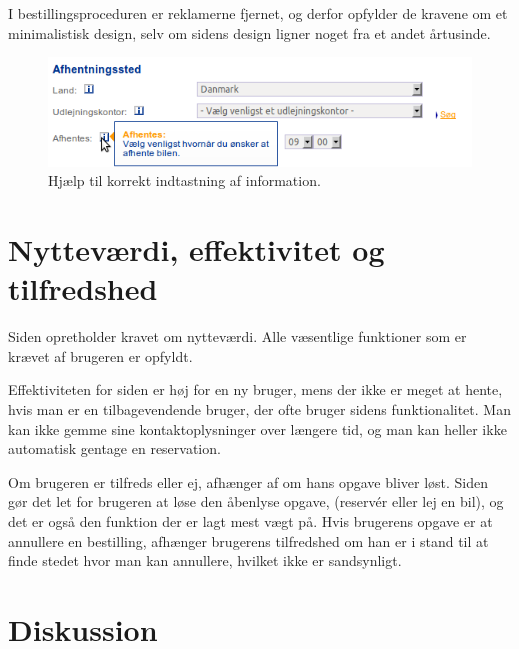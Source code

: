 \documentclass[a4paper]{article}
\begin{document}
I bestillingsproceduren er reklamerne fjernet, og derfor opfylder de kravene om
et minimalistisk design, selv om sidens design ligner noget fra et andet
årtusinde.

\begin{figure}[htbp]
  \begin{center}
    \includegraphics[scale=.6]{7.png}
  \end{center}
  \caption{Hjælp til korrekt indtastning af information.}
  \label{hjælp_kontaktinformation}
\end{figure}

\section{Nytteværdi, effektivitet og tilfredshed}
Siden opretholder kravet om nytteværdi. Alle væsentlige funktioner som er krævet
af brugeren er opfyldt.

Effektiviteten for siden er høj for en ny bruger, mens der ikke er meget at
hente, hvis man er en tilbagevendende bruger, der ofte bruger sidens
funktionalitet. Man kan ikke gemme sine kontaktoplysninger over længere tid, og
man kan heller ikke automatisk gentage en reservation.

Om brugeren er tilfreds eller ej, afhænger af om hans opgave bliver løst. Siden
gør det let for brugeren at løse den åbenlyse opgave, (reservér eller lej en
bil), og det er også den funktion der er lagt mest vægt på. Hvis brugerens
opgave er at annullere en bestilling, afhænger brugerens tilfredshed om han er i
stand til at finde stedet hvor man kan annullere, hvilket ikke er sandsynligt.

\section{Diskussion}
\end{document}
